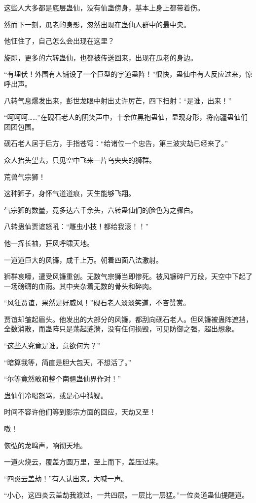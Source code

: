 \begin{this_body}
这些人大多都是底层蛊仙，没有仙蛊傍身，基本上身上都带着伤。

然而下一刻，瓜老的身影，忽然出现在蛊仙人群中的最中央。

他怔住了，自己怎么会出现在这里？

旋即，更多的六转蛊仙，也都被传送回来，出现在瓜老的身边。

“有埋伏！外围有人铺设了一个巨型的宇道蛊阵！”很快，蛊仙中有人反应过来，惊呼出声。

八转气息爆发出来，彭世龙眼中射出丈许厉芒，四下扫射：“是谁，出来！”

“呵呵呵……”在砚石老人的阴笑声中，十余位黑袍蛊仙，显现身形，将南疆蛊仙们团团包围。

砚石老人居于后方，手指苍穹：“给诸位一个忠告，第三波灾劫已经来了。”

众人抬头望去，只见空中飞来一片乌央央的狮群。

荒兽气宗狮！

这种狮子，身怀气道道痕，天生能够飞翔。

气宗狮的数量，竟多达六千余头，六转蛊仙们的脸色为之骤白。

八转蛊仙贾谊怒吼：“雕虫小技！都给我滚！！”

他一挥长袖，狂风呼啸天地。

一道道巨大的风镰，成千上万。朝着四面八法激射。

狮群哀嚎，遭受风镰重创。无数气宗狮当即惨死。被风镰碎尸万段，天空中下起了一场磅礴的血雨。其中夹杂着无数的骨头和碎肉。

“风狂贾谊，果然是好威风！”砚石老人淡淡笑道，不吝赞赏。

贾谊却皱起眉头。他发出的大部分的风镰，都刮向砚石老人。但风镰被蛊阵遮挡，全数消散，而蛊阵只是荡起涟漪，没有任何损毁，可见防御之强，超出想象。

“这些人究竟是谁。意欲何为？”

“暗算我等，简直是胆大包天，不想活了。”

“尔等竟然敢和整个南疆蛊仙界作对！”

蛊仙们冷喝怒骂，或是心中猜疑。

时间不容许他们等到影宗方面的回应，天劫又至！

嗷！

恢弘的龙鸣声，响彻天地。

一道火烧云，覆盖方圆万里，至上而下，盖压过来。

“四炎云盖劫！”有人认出来。大喊一声。

“小心，这四炎云盖劫我渡过，一共四层。一层比一层猛。”一位炎道蛊仙提醒道。


\end{this_body}

